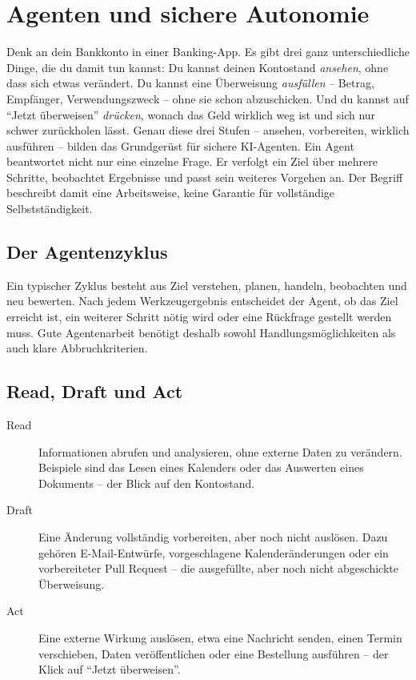 \chapter{Agenten und sichere Autonomie}

Denk an dein Bankkonto in einer Banking-App. Es gibt drei ganz unterschiedliche Dinge, die du damit tun kannst: Du kannst deinen Kontostand \emph{ansehen}, ohne dass sich etwas verändert. Du kannst eine Überweisung \emph{ausfüllen} -- Betrag, Empfänger, Verwendungszweck -- ohne sie schon abzuschicken. Und du kannst auf ``Jetzt überweisen'' \emph{drücken}, wonach das Geld wirklich weg ist und sich nur schwer zurückholen lässt. Genau diese drei Stufen -- ansehen, vorbereiten, wirklich ausführen -- bilden das Grundgerüst für sichere KI-Agenten. Ein Agent beantwortet nicht nur eine einzelne Frage. Er verfolgt ein Ziel über mehrere Schritte, beobachtet Ergebnisse und passt sein weiteres Vorgehen an. Der Begriff beschreibt damit eine Arbeitsweise, keine Garantie für vollständige Selbstständigkeit.



\section{Der Agentenzyklus}

Ein typischer Zyklus besteht aus Ziel verstehen, planen, handeln, beobachten und neu bewerten. Nach jedem Werkzeugergebnis entscheidet der Agent, ob das Ziel erreicht ist, ein weiterer Schritt nötig wird oder eine Rückfrage gestellt werden muss. Gute Agentenarbeit benötigt deshalb sowohl Handlungsmöglichkeiten als auch klare Abbruchkriterien.

\section{Read, Draft und Act}

\begin{description}
\item[Read] Informationen abrufen und analysieren, ohne externe Daten zu verändern. Beispiele sind das Lesen eines Kalenders oder das Auswerten eines Dokuments -- der Blick auf den Kontostand.
\item[Draft] Eine Änderung vollständig vorbereiten, aber noch nicht auslösen. Dazu gehören E-Mail-Entwürfe, vorgeschlagene Kalenderänderungen oder ein vorbereiteter Pull Request -- die ausgefüllte, aber noch nicht abgeschickte Überweisung.
\item[Act] Eine externe Wirkung auslösen, etwa eine Nachricht senden, einen Termin verschieben, Daten veröffentlichen oder eine Bestellung ausführen -- der Klick auf ``Jetzt überweisen''.
\end{description}


